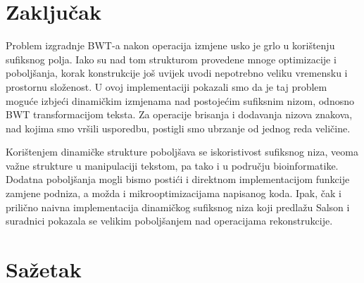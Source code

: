 \documentclass{ferseminar}
\begin{document}
\section{Zaključak}

Problem izgradnje BWT-a nakon operacija izmjene usko je grlo u korištenju sufiksnog polja. Iako su nad tom strukturom provedene mnoge optimizacije i poboljšanja, korak konstrukcije još uvijek uvodi nepotrebno veliku vremensku i prostornu složenost. U ovoj implementaciji pokazali smo da je taj problem moguće izbjeći dinamičkim izmjenama nad postojećim sufiksnim nizom, odnosno BWT transformacijom teksta. Za operacije brisanja i dodavanja nizova znakova, nad kojima smo vršili usporedbu, postigli smo ubrzanje od jednog reda veličine.

Korištenjem dinamičke strukture poboljšava se iskoristivost sufiksnog niza, veoma važne strukture u manipulaciji tekstom, pa tako i u području bioinformatike. Dodatna poboljšanja mogli bismo postići i direktnom implementacijom funkcije zamjene podniza, a možda i mikrooptimizacijama napisanog koda. Ipak, čak i prilično naivna implementacija dinamičkog sufiksnog niza koji predlažu Salson i suradnici pokazala se velikim poboljšanjem nad operacijama rekonstrukcije.
\section{Sažetak}
\end{document}
